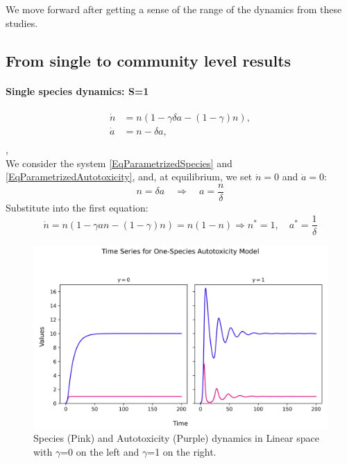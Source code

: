 \documentclass[11pt,a4paper,fleqn]{scrartcl}
\begin{document}
We move forward after getting a sense of the range of the dynamics from these studies.



\subsection{From single to community level results}
\date{May 2025}
\paragraph{Single species dynamics: S=1}

\begin{align}
\label{EqParametrizedSpecies}
\dot{n} &= n\left( 1 - \gamma \delta a - (1 - \gamma)n \right),\\
\label{EqParametrizedAutotoxicity}
\dot{a} &= n - \delta a,\\ \end{align},\\

We consider the system \ref{EqParametrizedSpecies} and \ref{EqParametrizedAutotoxicity}, and, at equilibrium, we set $\dot{n} = 0$ and $\dot{a} = 0$:
\[
n = \delta a \quad \Rightarrow \quad a = \frac{n}{\delta}
\]
Substitute into the first equation:
\[
\dot{n} = n \left( 1 - \gamma a n - (1 - \gamma) n \right) = n(1 - n)
\Rightarrow n^* = 1, \quad a^* = \frac{1}{\delta}
\]


\begin{figure}[H]
    \centering
    \includegraphics[width=\linewidth]{SingleSpecies/time_series_single_species.png}
    \caption{Species (Pink) and Autotoxicity (Purple) dynamics in Linear space with $\gamma$=0 on the left and $\gamma$=1 on the right.}
\end{figure}
\label{simulationOneSpecies}
\end{document}
